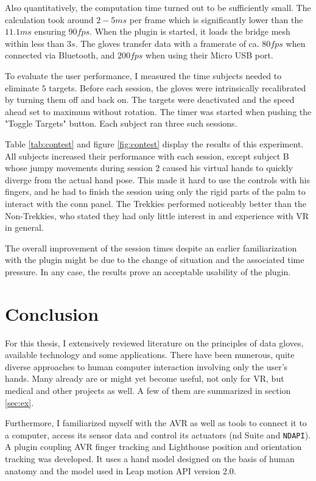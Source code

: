 \documentclass[hyperref, bachelorofscience]{cgvpub}
\begin{document}
Also quantitatively, the computation time turned out to be sufficiently small. The calculation took around $ 2-5ms $ per frame which is significantly lower than the $ 11.1ms $ ensuring $ 90fps $. When the plugin is started, it loads the bridge mesh within less than $ 3s $. The gloves transfer data with a framerate of ca. $ 80fps $ when connected via Bluetooth, and $ 200fps $ when using their Micro USB port. 

To evaluate the user performance, I measured the time subjects needed to eliminate $ 5 $ targets. Before each session, the gloves were intrinsically recalibrated by turning them off and back on. The targets were deactivated and the speed ahead set to maximum without rotation. The timer was started when pushing the "Toggle Targets" button. Each subject ran three such sessions.

Table \ref{tab:contest} and figure \ref{fig:contest} display the results of this experiment. All subjects increased their performance with each session, except subject B whose jumpy movements during session 2 caused his virtual hands to quickly diverge from the actual hand pose. This made it hard to use the controls with his fingers, and he had to finish the session using only the rigid parts of the palm to interact with the conn panel. The Trekkies performed noticeably better than the Non-Trekkies, who stated they had only little interest in and experience with VR in general. 

The overall improvement of the session times despite an earlier familiarization with the plugin might be due to the change of situation and the associated time pressure. In any case, the results prove an acceptable usability of the plugin.

\chapter{Conclusion}
For this thesis, I extensively reviewed literature on the principles of data gloves, available technology and some applications. There have been numerous, quite diverse approaches to human computer interaction involving only the user's hands. Many already are or might yet become useful, not only for VR, but medical and other projects as well. A few of them are summarized in section \ref{sec:ex}.

Furthermore, I familiarized myself with the \Gls{AVR} as well as tools to connect it to a computer, access its sensor data and control its actuators (\acrshort{nd} Suite and \lstinline|NDAPI|). A plugin coupling \Gls{AVR} finger tracking and Lighthouse position and orientation tracking was developed. It uses a hand model designed on the basis of human anatomy and the model used in Leap motion API version 2.0. 
\end{document}

